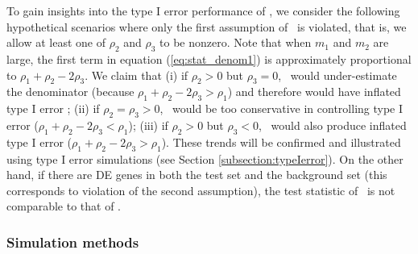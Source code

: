 	To gain insights into the type I error performance of \CMT, we 
	consider the following hypothetical scenarios where only the first assumption of \CMT~is 
	violated, that is, we allow at least one of $\rho_2$ and $\rho_3$ to be nonzero. Note that when 
	$m_1$ and $m_2$ are large, the first term in equation (\ref{eq:stat_denom1}) is approximately 
	proportional to $\rho_1+\rho_2-2\rho_3$. We claim that (i) if 
	$\rho_2>0$ but $\rho_3=0$, \CMT~would under-estimate the denominator (because 
	$\rho_1+\rho_2-2\rho_3 > \rho_1$) and therefore 
	would have inflated type I error ; (ii) if 
	$\rho_2=\rho_3>0$, \CMT~would be too conservative 
	in controlling type I error ($\rho_1+\rho_2-2\rho_3 < \rho_1$); (iii) if $\rho_2>0$ but 
	$\rho_3< 0$, \CMT~would also produce 
	inflated type I error ($\rho_1+\rho_2-2\rho_3 > \rho_1$). These trends will be confirmed and 
	illustrated using type I error simulations (see Section \ref{subsection:typeIerror}). On the 
	other hand, if there 
	are DE genes in both the test set and the background set (this corresponds to violation of the 
	second assumption), the test statistic of \CMT~is not comparable to that of \OurMethod. 

	
	
	
	\subsubsection{Simulation methods}
	
